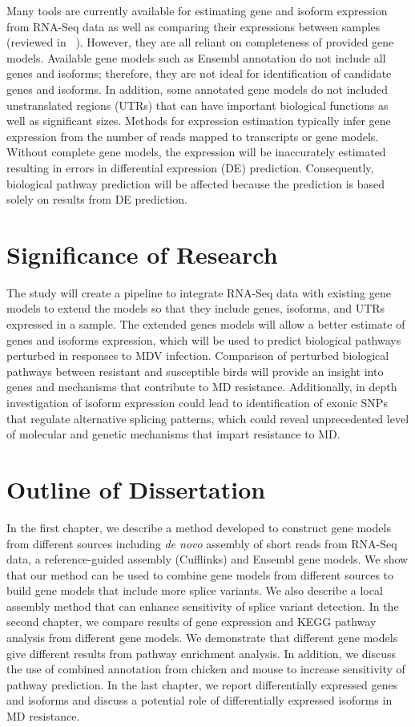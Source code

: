 Many tools are currently available for estimating gene and
isoform expression from RNA-Seq data as well as comparing
their expressions between samples (reviewed in
~\cite{trapnell2012differential}).  However, they are all
reliant on completeness of provided gene models.  Available
gene models such as Ensembl annotation do not include all
genes and isoforms; therefore, they are not ideal for
identification of candidate genes and isoforms.  In
addition, some annotated gene models do not included
unstranslated regions (UTRs) that can have important
biological functions as well as significant sizes.  Methods
for expression estimation typically infer gene expression
from the number of reads mapped to transcripts or gene
models.  Without complete gene models, the expression will
be inaccurately estimated resulting in errors in
differential expression (DE) prediction.  Consequently,
biological pathway prediction will be affected because the
prediction is based solely on results from DE prediction.

\section{Significance of Research}

The study will create a pipeline to integrate RNA-Seq data
with existing gene models to extend the models so that they
include genes, isoforms, and UTRs expressed in a sample.
The extended genes models will allow a better estimate of
genes and isoforms expression, which will be used to predict
biological pathways perturbed in responses to MDV infection.
Comparison of perturbed biological pathways between
resistant and susceptible birds will provide an insight into
genes and mechanisms that contribute to MD resistance.
Additionally, in depth investigation of isoform expression
could lead to identification of exonic SNPs that regulate
alternative splicing patterns, which could reveal
unprecedented level of molecular and genetic mechanisms that
impart resistance to MD.

\section{Outline of Dissertation}

In the first chapter, we describe a method developed to
construct gene models from different sources including {\em
de novo} assembly of short reads from RNA-Seq data, a
reference-guided assembly (Cufflinks) and Ensembl gene
models. We show that our method can be used to combine gene
models from different sources to build gene models that
include more splice variants. We also describe a local
assembly method that can enhance sensitivity of splice
variant detection. In the second chapter, we compare
results of gene expression and KEGG pathway analysis from
different gene models. We demonstrate that different gene
models give different results from pathway enrichment
analysis. In addition, we discuss the use of combined
annotation from chicken and mouse to increase sensitivity of
pathway prediction. In the last chapter, we report
differentially expressed genes and isoforms and discuss a
potential role of differentially expressed isoforms in MD
resistance.
